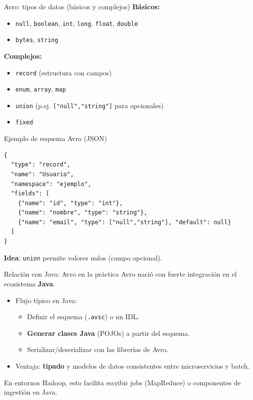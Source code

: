\documentclass{beamer}
\begin{document}
\begin{frame}{Avro: tipos de datos (básicos y complejos)}
\textbf{Básicos:}
\begin{itemize}
    \item \texttt{null}, \texttt{boolean}, \texttt{int}, \texttt{long}, \texttt{float}, \texttt{double}
    \item \texttt{bytes}, \texttt{string}
\end{itemize}

\textbf{Complejos:}
\begin{itemize}
    \item \texttt{record} (estructura con campos)
    \item \texttt{enum}, \texttt{array}, \texttt{map}
    \item \texttt{union} (p.ej. \texttt{["null","string"]} para opcionales)
    \item \texttt{fixed}
\end{itemize}
\end{frame}

\begin{frame}[fragile]{Ejemplo de esquema Avro (JSON)}
\begin{verbatim}
{
  "type": "record",
  "name": "Usuario",
  "namespace": "ejemplo",
  "fields": [
    {"name": "id", "type": "int"},
    {"name": "nombre", "type": "string"},
    {"name": "email", "type": ["null","string"], "default": null}
  ]
}
\end{verbatim}

\medskip
\textbf{Idea}: \texttt{union} permite valores nulos (campo opcional).
\end{frame}

\begin{frame}{Relación con Java: Avro en la práctica}
Avro nació con fuerte integración en el ecosistema \textbf{Java}.

\begin{itemize}
    \item Flujo típico en Java:
    \begin{itemize}
        \item Definir el esquema (\texttt{.avsc}) o un IDL.
        \item \textbf{Generar clases Java} (POJOs) a partir del esquema.
        \item Serializar/deserializar con las librerías de Avro.
    \end{itemize}
    \item Ventaja: \textbf{tipado} y modelos de datos consistentes entre microservicios y batch.
\end{itemize}

\medskip
En entornos Hadoop, esto facilita escribir jobs (MapReduce) o componentes de ingestión en Java.
\end{frame}
\end{document}
